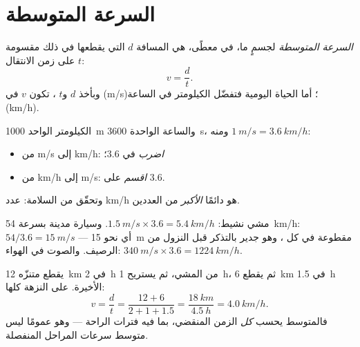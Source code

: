 \section{السرعة المتوسطة}

\begin{definition}\label{def:g10:relative-motion:speed}
\emph{السرعة المتوسطة} لجسمٍ ما، في 
معطًى، هي المسافة $d$ التي يقطعها في ذلك  مقسومة على
زمن الانتقال $t$:
\[
v = \frac{d}{t} .
\]
وبأخذ $d$  و$t$ ، تكون $v$  في 
(\unit{m/s})؛ أما الحياة اليومية فتفضّل الكيلومتر في الساعة (\unit{km/h}).
\end{definition}

\begin{method}\label{met:g10:relative-motion:convert}
الكيلومتر الواحد \qty{1000}{m} والساعة الواحدة \qty{3600}{s}، ومنه
$\qty{1}{m/s} = \qty{3.6}{km/h}$:
\begin{itemize}
  \item من \unit{m/s} إلى \unit{km/h}: \emph{اضرب} في $3.6$؛
  \item من \unit{km/h} إلى \unit{m/s}: \emph{اقسم} على $3.6$.
\end{itemize}
وتحقّق من السلامة: عدد \unit{km/h} هو دائمًا \emph{الأكبر} من
العددين.
\end{method}

\begin{example}\label{ex:g10:relative-motion:convert}
مشي نشيط: $\qty{1.5}{m/s} \times 3.6 = \qty{5.4}{km/h}$. وسيارة مدينة
بسرعة \qty{54}{km/h}: $54 / 3.6 = \qty{15}{m/s}$ --- أي نحو \qty{15}{m}
مقطوعة في كل ، وهو جدير بالتذكر قبل النزول من الرصيف.
والصوت في الهواء: $\qty{340}{m/s} \times 3.6 = \qty{1224}{km/h}$.
\end{example}

\begin{example}\label{ex:g10:relative-motion:hike}
يقطع متنزّه \qty{12}{km} في \qty{2}{h} من المشي، ثم يستريح
\qty{1}{h}، ثم يقطع \qty{6}{km} في \qty{1.5}{h} الأخيرة.  على النزهة كلها:
\[
v = \frac{d}{t} = \frac{12 + 6}{2 + 1 + 1.5}
= \frac{\qty{18}{km}}{\qty{4.5}{h}} = \qty{4.0}{km/h}.
\]
فالمتوسط يحسب \emph{كل} الزمن المنقضي، بما فيه فترات الراحة --- وهو
عمومًا ليس متوسط سرعات المراحل المنفصلة.
\end{example}

